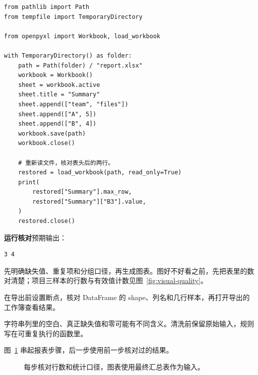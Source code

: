 \documentclass[UTF8,a4paper,oneside,openany,fontset=none,11pt]{ctexbook}
\newcommand{\code}[1]{\texttt{\detokenize{#1}}}
\begin{document}
\begin{lstlisting}[title={\code{write_workbook.py}}]
from pathlib import Path
from tempfile import TemporaryDirectory

from openpyxl import Workbook, load_workbook

with TemporaryDirectory() as folder:
    path = Path(folder) / "report.xlsx"
    workbook = Workbook()
    sheet = workbook.active
    sheet.title = "Summary"
    sheet.append(["team", "files"])
    sheet.append(["A", 5])
    sheet.append(["B", 4])
    workbook.save(path)
    workbook.close()

    # 重新读文件，核对表头后的两行。
    restored = load_workbook(path, read_only=True)
    print(
        restored["Summary"].max_row,
        restored["Summary"]["B3"].value,
    )
    restored.close()
\end{lstlisting}


\textbf{运行核对}\enspace 预期输出：
\begin{lstlisting}[language={},numbers=none]
3 4
\end{lstlisting}

\par

\begin{myunderstanding}
先明确缺失值、重复项和分组口径，再生成图表。图好不好看之前，先把表里的数对清楚；项目三样本的行数与有效值计数见图~\ref{fig:visual-quality}。
\end{myunderstanding}

\begin{pycharmpractice}
在导出前设置断点，核对 DataFrame 的 shape、列名和几行样本，再打开导出的工作簿查看结果。
\end{pycharmpractice}

\begin{pitfall}
字符串列里的空白、真正缺失值和零可能有不同含义。清洗前保留原始输入，规则写在可重复执行的函数里。
\end{pitfall}
图~\ref{fig:chapter-16-flow} 串起报表步骤，后一步使用前一步核对过的结果。
\begin{figure}[htbp]
  \centering
  \caption{每步核对行数和统计口径，图表使用最终汇总表作为输入。}
  \label{fig:chapter-16-flow}
\end{figure}
\end{document}
